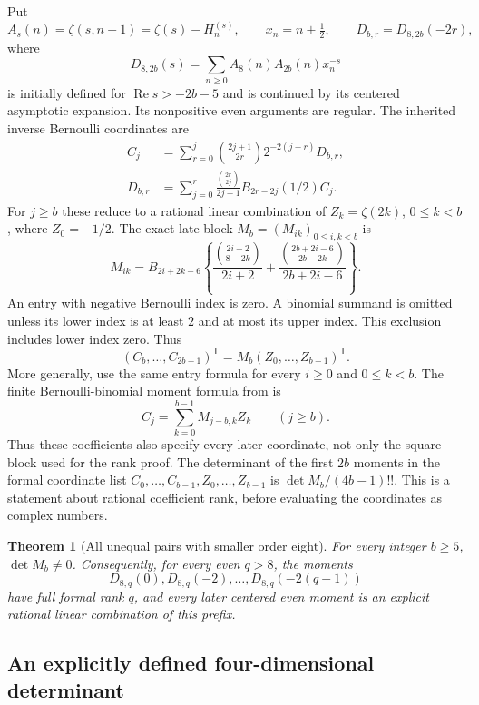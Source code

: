 \documentclass[11pt,a4paper]{article}
\numberwithin{equation}{section}
\theoremstyle{plain}
\newtheorem{theorem}{Theorem}[section]
\theoremstyle{definition}
\theoremstyle{remark}
\begin{document}
Put
\[
 A_s(n)=\zeta(s,n+1)=\zeta(s)-H_n^{(s)},\qquad x_n=n+\tfrac12,
 \qquad D_{b,r}=D_{8,2b}(-2r),
\]
where
\[
 D_{8,2b}(s)=\sum_{n\ge0}A_8(n)A_{2b}(n)x_n^{-s}
\]
is initially defined for $\operatorname{Re}s>-2b-5$ and is continued
by its centered asymptotic expansion. Its nonpositive even arguments
are regular. The inherited inverse Bernoulli coordinates are
\begin{align}
 C_j&=\sum_{r=0}^j\binom{2j+1}{2r}2^{-2(j-r)}D_{b,r},
 \label{r8c:C}\\
 D_{b,r}&=\sum_{j=0}^r\frac{\binom{2r}{2j}}{2j+1}
 B_{2r-2j}(1/2)C_j.
 \label{r8c:D}
\end{align}
For $j\ge b$ these reduce to a rational linear combination of
$Z_k=\zeta(2k)$, $0\le k<b$, where $Z_0=-1/2$.
The exact late block $M_b=(M_{ik})_{0\le i,k<b}$ is
\begin{equation}\label{r8c:M}
 M_{ik}=B_{2i+2k-6}
 \left\{\frac{\binom{2i+2}{8-2k}}{2i+2}
 +\frac{\binom{2b+2i-6}{2b-2k}}{2b+2i-6}\right\}.
\end{equation}
An entry with negative Bernoulli index is zero. A binomial summand is
omitted unless its lower index is at least $2$ and at most its upper
index. This exclusion includes lower index zero. Thus
\[
 (C_b,\ldots,C_{2b-1})^{\mathsf T}
       =M_b(Z_0,\ldots,Z_{b-1})^{\mathsf T}.
\]
More generally, use the same entry formula for every $i\ge0$ and
$0\le k<b$.  The finite Bernoulli-binomial moment formula from
\cite{GeneralHankel} is
\[
 C_j=\sum_{k=0}^{b-1}M_{j-b,k}Z_k\qquad(j\ge b).
\]
Thus these coefficients also specify every later coordinate,
not only the square block used for the rank proof.
The determinant of the first $2b$ moments in the formal coordinate
list $C_0,\ldots,C_{b-1},Z_0,\ldots,Z_{b-1}$ is
$\det M_b/(4b-1)!!$. This is a statement about rational coefficient
rank, before evaluating the coordinates as complex numbers.

\begin{theorem}[All unequal pairs with smaller order eight]
\label{r8c:main}
For every integer $b\ge5$, $\det M_b\ne0$. Consequently, for every
even $q>8$, the moments
\[
 D_{8,q}(0),D_{8,q}(-2),\ldots,D_{8,q}(-2(q-1))
\]
have full formal rank $q$, and every later centered even moment is
an explicit rational linear combination of this prefix.
\end{theorem}

\subsection{An explicitly defined four-dimensional determinant}
\end{document}
